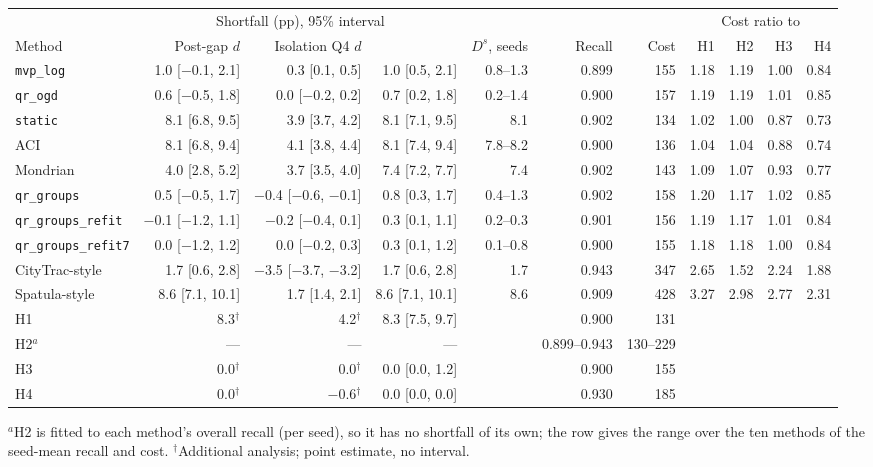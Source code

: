 \begin{tabular}{@{}lrrrrrrrrrr@{}}
\toprule
 & \multicolumn{3}{c}{Shortfall (pp), 95\% interval} & & & & \multicolumn{4}{c}{Cost ratio to} \\
\cmidrule(lr){2-4}\cmidrule(l){8-11}
Method & Post-gap $d$ & Isolation Q4 $d$ & \Dbar{} & $D^s$, seeds & Recall & Cost & H1 & H2 & H3 & H4 \\
\midrule
\texttt{mvp\_log} & 1.0 [$-$0.1, 2.1] & 0.3 [0.1, 0.5] & 1.0 [0.5, 2.1] & 0.8--1.3 & 0.899 & 155 & 1.18 & 1.19 & 1.00 & 0.84 \\
\texttt{qr\_ogd} & 0.6 [$-$0.5, 1.8] & 0.0 [$-$0.2, 0.2] & 0.7 [0.2, 1.8] & 0.2--1.4 & 0.900 & 157 & 1.19 & 1.19 & 1.01 & 0.85 \\
\addlinespace
\texttt{static} & 8.1 [6.8, 9.5] & 3.9 [3.7, 4.2] & 8.1 [7.1, 9.5] & 8.1 & 0.902 & 134 & 1.02 & 1.00 & 0.87 & 0.73 \\
ACI & 8.1 [6.8, 9.4] & 4.1 [3.8, 4.4] & 8.1 [7.4, 9.4] & 7.8--8.2 & 0.900 & 136 & 1.04 & 1.04 & 0.88 & 0.74 \\
Mondrian & 4.0 [2.8, 5.2] & 3.7 [3.5, 4.0] & 7.4 [7.2, 7.7] & 7.4 & 0.902 & 143 & 1.09 & 1.07 & 0.93 & 0.77 \\
\texttt{qr\_groups} & 0.5 [$-$0.5, 1.7] & $-$0.4 [$-$0.6, $-$0.1] & 0.8 [0.3, 1.7] & 0.4--1.3 & 0.902 & 158 & 1.20 & 1.17 & 1.02 & 0.85 \\
\texttt{qr\_groups\_refit} & $-$0.1 [$-$1.2, 1.1] & $-$0.2 [$-$0.4, 0.1] & 0.3 [0.1, 1.1] & 0.2--0.3 & 0.901 & 156 & 1.19 & 1.17 & 1.01 & 0.84 \\
\texttt{qr\_groups\_refit7} & 0.0 [$-$1.2, 1.2] & 0.0 [$-$0.2, 0.3] & 0.3 [0.1, 1.2] & 0.1--0.8 & 0.900 & 155 & 1.18 & 1.18 & 1.00 & 0.84 \\
CityTrac-style & 1.7 [0.6, 2.8] & $-$3.5 [$-$3.7, $-$3.2] & 1.7 [0.6, 2.8] & 1.7 & 0.943 & 347 & 2.65 & 1.52 & 2.24 & 1.88 \\
Spatula-style & 8.6 [7.1, 10.1] & 1.7 [1.4, 2.1] & 8.6 [7.1, 10.1] & 8.6 & 0.909 & 428 & 3.27 & 2.98 & 2.77 & 2.31 \\
\addlinespace
H1 & 8.3$^\dagger$ & 4.2$^\dagger$ & 8.3 [7.5, 9.7] & & 0.900 & 131 &  &  &  & \\
H2$^{a}$ & --- & --- & --- & & 0.899--0.943 & 130--229 &  &  &  & \\
H3 & 0.0$^\dagger$ & 0.0$^\dagger$ & 0.0 [0.0, 1.2] & & 0.900 & 155 &  &  &  & \\
H4 & 0.0$^\dagger$ & $-$0.6$^\dagger$ & 0.0 [0.0, 0.0] & & 0.930 & 185 &  &  &  & \\
\bottomrule
\end{tabular}

\smallskip\parbox{\textwidth}{\footnotesize $^{a}$H2 is fitted to each method's overall recall (per seed), so it has no shortfall of its own; the row gives the range over the ten methods of the seed-mean recall and cost. $^\dagger$Additional analysis; point estimate, no interval.}
